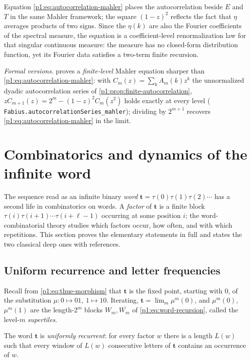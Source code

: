 \documentclass[11pt,oneside]{article}
\numberwithin{equation}{section}
\theoremstyle{definition}
\theoremstyle{remark}
\newcommand{\lean}[1]{%
  \ifmmode\text{\nolinkurl{#1}}\else\nolinkurl{#1}\fi}
\begin{document}
Equation \eqref{p1:eq:autocorrelation-mahler} places the autocorrelation beside
\(E\) and \(T\) in the same Mahler framework; the square \((1-z)^2\)
reflects the fact that \(\eta\) averages products of two signs.  Since the
\(\eta(k)\) are also the Fourier coefficients of the spectral measure, the
equation is a coefficient-level renormalization law for that singular
continuous measure: the measure has no closed-form distribution function,
yet its Fourier data satisfies a two-term finite recursion.

\emph{Formal versions.}   proves a
\emph{finite-level} Mahler equation sharper than
\eqref{p1:eq:autocorrelation-mahler}: with
\(C_m(z)=\sum_kA_m(k)z^k\) the unnormalized dyadic autocorrelation
series of \cref{p1:prop:finite-autocorrelation},
\(zC_{m+1}(z)=2^m-(1-z)^2C_m(z^2)\) holds exactly at every level
(\lean{Fabius.autocorrelationSeries\_mahler}); dividing by
\(2^{m+1}\) recovers \eqref{p1:eq:autocorrelation-mahler} in the limit.

\section[Word combinatorics and dynamics]{Combinatorics and dynamics of the infinite word}
\label{p1:sec:words-dynamics}

The sequence read as an infinite binary \emph{word}
\(\mathbf t=\tau(0)\tau(1)\tau(2)\cdots\) has a second life in combinatorics
on words.  A \emph{factor} of \(\mathbf t\) is a finite block
\(\tau(i)\tau(i+1)\cdots\tau(i+\ell-1)\) occurring at some position \(i\);
the word-combinatorial theory studies which factors occur, how often, and
with which repetitions.  This section proves the elementary statements in
full and states the two classical deep ones with references.

\subsection{Uniform recurrence and letter frequencies}

Recall from \eqref{p1:eq:thue-morphism} that \(\mathbf t\) is the fixed point,
starting with \(0\), of the substitution
\(\mu:0\mapsto01,\ 1\mapsto10\).  Iterating,
\(\mathbf t=\lim_m\mu^m(0)\), and \(\mu^m(0)\), \(\mu^m(1)\) are the
length-\(2^m\) blocks \(W_m,\overline{W_m}\) of
\eqref{p1:eq:word-recursion}, called the level-\(m\) \emph{supertiles}.

\begin{proposition}
\label{p1:prop:uniform-recurrence}
The word \(\mathbf t\) is \emph{uniformly recurrent}: for every factor
\(w\) there is a length \(L(w)\) such that every window of \(L(w)\)
consecutive letters of \(\mathbf t\) contains an occurrence of \(w\).
\end{proposition}
\end{document}
